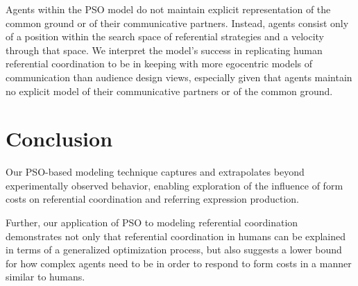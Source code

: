 \documentclass[a4paper,11pt]{article}
\begin{document}
Agents within the PSO model do not maintain explicit representation of the common ground or of their communicative partners. Instead, agents consist only of a position within the search space of referential strategies and a velocity through that space. We interpret the model's success in replicating human referential coordination to be in keeping with more egocentric models of communication \cite{horton1996} than audience design views, especially given that agents maintain no explicit model of their communicative partners or of the common ground.

\section{Conclusion}
Our PSO-based modeling technique captures and extrapolates beyond experimentally observed behavior, enabling exploration of the influence of form costs on referential coordination and referring expression production.

Further, our application of PSO to modeling referential coordination demonstrates not only that referential coordination in humans can be explained in terms of a generalized optimization process, but also suggests a lower bound for how complex agents need to be in order to respond to form costs in a manner similar to humans.




\end{document}
